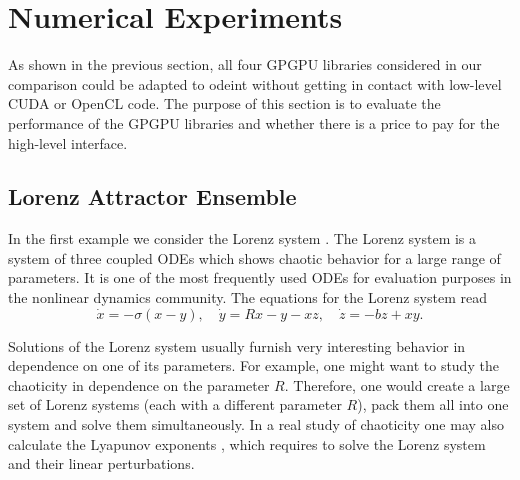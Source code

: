 \documentclass[final]{siamltex}
\begin{document}
%
%
\section{Numerical Experiments}

As shown in the previous section, all four GP\-GPU libraries considered
in our comparison could be adapted to odeint without getting in
contact with low-level CUDA or OpenCL code.  The purpose of this
section is to evaluate the performance of the GPGPU libraries and
whether there is a price to pay for the high-level interface.






%
%

\subsection{Lorenz Attractor Ensemble}

In the first example we consider the Lorenz system \cite{Lorenz-63}. The
Lorenz system is a system of three coupled ODEs which shows chaotic
behavior for a large range of parameters. It is one of the most frequently
used ODEs for evaluation purposes in the nonlinear dynamics community.   %
The equations for the Lorenz system read
\begin{equation}
    \dot{x} = -\sigma \left( x - y \right), \quad
    \dot{y} = R x - y - xz, \quad
    \dot{z} = -bz + xy.
    \label{eq:lorenz}
\end{equation}

Solutions of the Lorenz system usually furnish very interesting
behavior in dependence on one of its parameters.  For example, one
might want to study the chaoticity in dependence on the parameter
$R$. Therefore, one would create a large set of Lorenz systems (each
with a different parameter $R$), pack them all into one system and
solve them simultaneously. In a real study of chaoticity one
may also calculate the Lyapunov exponents \cite{Ott-book-02}, which
requires to solve the Lorenz system and their linear perturbations.

\end{document}
